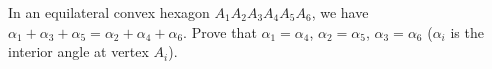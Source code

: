 In an equilateral convex hexagon $A_1A_2A_3A_4A_5A_6$, we have $\alpha_1 + \alpha_3 + \alpha_5 = \alpha_2 + \alpha_4 + \alpha_6$. Prove that $\alpha_1 = \alpha_4$, $\alpha_2 = \alpha_5$, $\alpha_3 = \alpha_6$ ($\alpha_i$ is the interior angle at vertex $A_i$).
